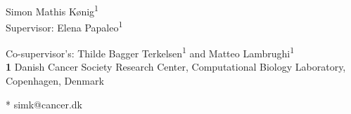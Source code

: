 \documentclass[10pt,letterpaper]{article}
\begin{document}
\vspace*{0.2in}

\begin{flushleft}
{\Large
\textbf{} %
}
\newline
\\
Simon Mathis Kønig\textsuperscript{1}
\\
\bigskip
Supervisor: Elena Papaleo\textsuperscript{1}

Co-supervisor's: Thilde Bagger Terkelsen\textsuperscript{1} and Matteo Lambrughi\textsuperscript{1}
\\
\bigskip
\textbf{1} Danish Cancer Society Research Center, Computational Biology Laboratory, Copenhagen, Denmark
\bigskip

* simk@cancer.dk

\end{flushleft}
\end{document}
